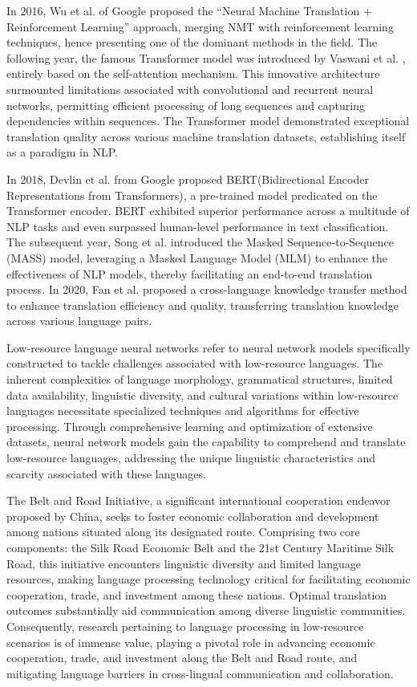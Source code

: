 \documentclass[acmsmall]{acmart}
\begin{document}
In 2016, Wu et al. \cite{1-6} of Google proposed the ``Neural Machine Translation + Reinforcement Learning'' approach, merging NMT with reinforcement learning techniques, hence presenting one of the dominant methods in the field. The following year, the famous Transformer model was introduced by Vaswani et al. \cite{1-7}, entirely based on the self-attention mechanism. This innovative architecture surmounted limitations associated with convolutional and recurrent neural networks, permitting efficient processing of long sequences and capturing dependencies within sequences. The Transformer model demonstrated exceptional translation quality across various machine translation datasets, establishing itself as a paradigm in NLP.

In 2018, Devlin et al. \cite{1-8} from Google proposed BERT(Bidirectional Encoder Representations from Transformers), a pre-trained model predicated on the Transformer encoder. BERT exhibited superior performance across a multitude of NLP tasks and even surpassed human-level performance in text classification. The subsequent year, Song et al. \cite{1-9} introduced the Masked Sequence-to-Sequence (MASS) model, leveraging a Masked Language Model (MLM) to enhance the effectiveness of NLP models, thereby facilitating an end-to-end translation process. In 2020, Fan et al. \cite{1-10} proposed a cross-language knowledge transfer method to enhance translation efficiency and quality, transferring translation knowledge across various language pairs.

Low-resource language neural networks refer to neural network models specifically constructed to tackle challenges associated with low-resource languages. The inherent complexities of language morphology, grammatical structures, limited data availability, linguistic diversity, and cultural variations within low-resource languages necessitate specialized techniques and algorithms for effective processing. Through comprehensive learning and optimization of extensive datasets, neural network models gain the capability to comprehend and translate low-resource languages, addressing the unique linguistic characteristics and scarcity associated with these languages.

The Belt and Road Initiative, a significant international cooperation endeavor proposed by China, seeks to foster economic collaboration and development among nations situated along its designated route. Comprising two core components: the Silk Road Economic Belt and the 21st Century Maritime Silk Road, this initiative encounters linguistic diversity and limited language resources, making language processing technology critical for facilitating economic cooperation, trade, and investment among these nations. Optimal translation outcomes substantially aid communication among diverse linguistic communities. Consequently, research pertaining to language processing in low-resource scenarios is of immense value, playing a pivotal role in advancing economic cooperation, trade, and investment along the Belt and Road route, and mitigating language barriers in cross-lingual communication and collaboration.
\end{document}
